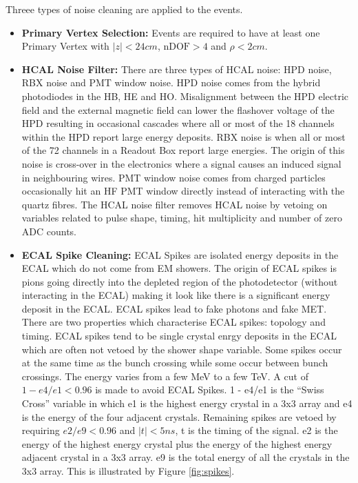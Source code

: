 Threee types of noise cleaning are applied to the events. 
\begin{itemize}
\item {\bf Primary Vertex Selection:} Events are required to have at least one
Primary Vertex with $|z| < 24\unit{cm}$, $\mbox{nDOF} > 4$ and $\rho <
2\unit{cm}$.
\item {\bf HCAL Noise Filter:} There are three types of HCAL noise: HPD noise, 
RBX noise and PMT window noise. HPD noise comes from the hybrid photodiodes in
the HB, HE and HO. Misalignment between the HPD electric field and the external
magnetic field can lower the flashover voltage of the HPD resulting in 
occasional cascades where all or most of the 18 channels within the HPD report
large energy deposits. RBX noise is when all or most of the 72 channels in a
Readout Box report large energies. The origin of this noise is cross-over in the
electronics where a signal causes an induced signal in neighbouring wires.
PMT window noise comes from charged particles occasionally hit an HF PMT window 
directly instead of interacting with the quartz fibres. The HCAL noise filter 
removes HCAL noise by vetoing on variables related to pulse shape, timing, hit 
multiplicity and number of zero ADC counts.
\item {\bf ECAL Spike Cleaning:} ECAL Spikes are isolated energy deposits in 
the ECAL which do not come from EM showers. The origin of ECAL spikes is pions
going directly into the depleted region of the photodetector (without
interacting in the ECAL) making it look like there is a significant energy 
deposit in the ECAL. ECAL spikes lead to fake photons and fake MET. There are 
two properties which characterise ECAL spikes: topology and timing. ECAL spikes 
tend to be single crystal enrgy deposits in the ECAL which are often not vetoed 
by the shower shape variable. Some spikes occur at the same time as the bunch
crossing while some occur between bunch crossings. The energy varies from a few 
MeV to a few TeV. A cut of $1 - e4/e1 < 0.96$ is made to avoid ECAL Spikes. 1 - 
e4/e1 is the ``Swiss Cross'' variable in which e1 is the highest energy crystal 
in a 3x3 array and e4 is the energy of the four adjacent crystals. Remaining 
spikes are vetoed by requiring $e2/e9 < 0.96$ and $|t| < 5\unit{ns}$, t is the 
timing of the signal. e2 is the energy of the highest energy crystal plus the
energy of the highest energy adjacent crystal in a 3x3 array. e9 is the total
energy of all the crystals in the 3x3 array. This is illustrated by Figure 
\ref{fig:spikes}.
\end{itemize}

